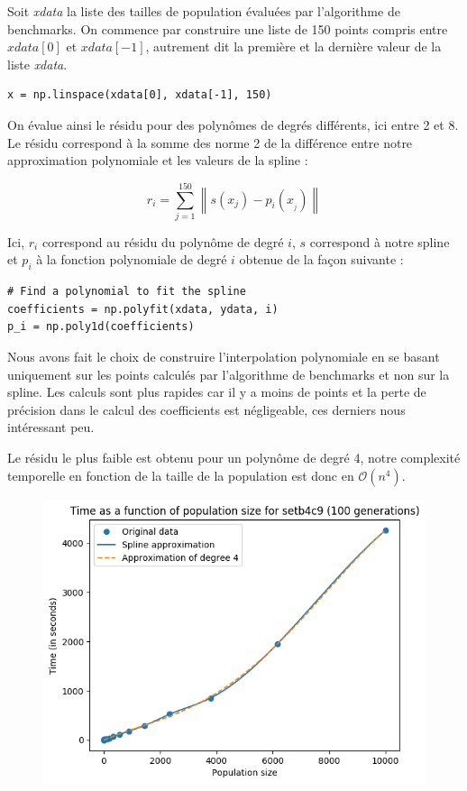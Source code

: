 Soit \textit{xdata} la liste des tailles de population évaluées par l'algorithme de benchmarks. On commence par construire une liste de 150 points compris entre $xdata[0]$ et $xdata[-1]$, autrement dit la première et la dernière valeur de la liste \textit{xdata}.

\begin{lstlisting}
x = np.linspace(xdata[0], xdata[-1], 150)
\end{lstlisting}

On évalue ainsi le résidu pour des polynômes de degrés différents, ici entre 2 et 8. Le résidu correspond à la somme des norme 2 de la différence entre notre approximation polynomiale et les valeurs de la spline :

$$ r_i = \sum_{j = 1}^{150} \left\| s(x_j) - p_i(x__j) \right\| $$

Ici, $r_i$ correspond au résidu du polynôme de degré $i$, $s$ correspond à notre spline et $p_i$ à la fonction polynomiale de degré $i$ obtenue de la façon suivante :

\begin{lstlisting}
# Find a polynomial to fit the spline
coefficients = np.polyfit(xdata, ydata, i)
p_i = np.poly1d(coefficients)
\end{lstlisting}

Nous avons fait le choix de construire l'interpolation polynomiale en se basant uniquement sur les points calculés par l'algorithme de benchmarks et non sur la spline. Les calculs sont plus rapides car il y a moins de points et la perte de précision dans le calcul des coefficients est négligeable, ces derniers nous intéressant peu.

Le résidu le plus faible est obtenu pour un polynôme de degré 4, notre complexité temporelle en fonction de la taille de la population est donc en $\mathcal{O}(n^4)$.

\begin{figure}[!h]
    \centering
    \includegraphics[scale=0.9]{report/Pictures/setb4c9_benchmarks_population_approximated.png}
\end{figure}

